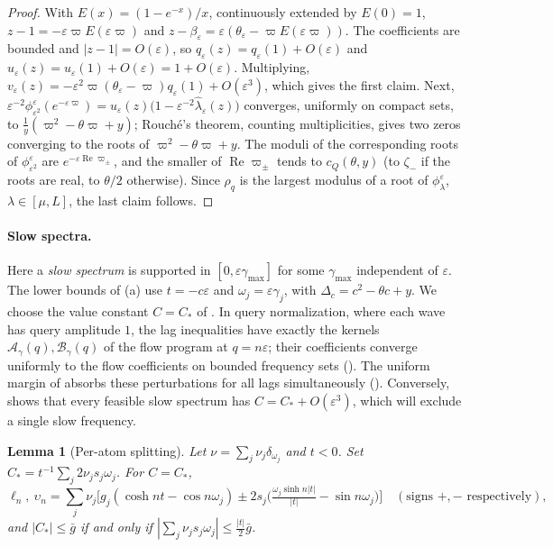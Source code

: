 \documentclass[11pt]{article}
\newtheorem{lemma}[theorem]{Lemma}
\theoremstyle{definition}
\theoremstyle{remark}
\newcommand{\cA}{\mathcal A}
\newcommand{\cB}{\mathcal B}
\newcommand{\ch}{\cosh}
\newcommand{\sh}{\sinh}
\newcommand{\Rea}{\operatorname{Re}}
\newcommand{\cQ}{c_{Q}}
\begin{document}
\begin{proof}
With \(E(x)=(1-e^{-x})/x\), continuously extended by \(E(0)=1\), \(z-1=-\varepsilon\varpi E(\varepsilon\varpi)\) and \(z-\beta_\varepsilon=\varepsilon(\theta_\varepsilon-\varpi E(\varepsilon\varpi))\).  The
coefficients are bounded and \(|z-1|=O(\varepsilon)\), so \(q_\varepsilon(z)=q_\varepsilon(1)+O(\varepsilon)\) and
\(u_\varepsilon(z)=u_\varepsilon(1)+O(\varepsilon)=1+O(\varepsilon)\).  Multiplying, \(v_\varepsilon(z)=-\varepsilon^2\varpi(\theta_\varepsilon-\varpi)q_\varepsilon(1)+O(\varepsilon^3)\), which gives
the first claim.  Next, \(\varepsilon^{-2}\phi^\varepsilon_{\varepsilon^2}(e^{-\varepsilon\varpi})=u_\varepsilon(z)\bigl(1-\varepsilon^{-2}\hat\lambda_\varepsilon(z)\bigr)\) converges, uniformly
on compact sets, to \(\frac1y(\varpi^2-\theta\varpi+y)\); Rouch\'e's theorem, counting multiplicities, gives two zeros converging
to the roots of \(\varpi^2-\theta\varpi+y\).  The moduli of the corresponding roots of \(\phi^\varepsilon_{\varepsilon^2}\) are \(e^{-\varepsilon\Rea\varpi_\pm}\),
and the smaller of \(\Rea\varpi_\pm\) tends to \(\cQ(\theta,y)\) (to \(\zeta_-\) if the roots are real, to \(\theta/2\)
otherwise).  Since \(\rho_q\) is the largest modulus of a root of \(\phi^\varepsilon_\lambda\), \(\lambda\in[\mu,L]\), the last claim
follows.
\end{proof}

\paragraph{Slow spectra.}
Here a \emph{slow spectrum} is supported in \([0,\varepsilon\gamma_{\max}]\)
for some \(\gamma_{\max}\) independent of \(\varepsilon\).
The lower bounds of (a) use \(t=-c\varepsilon\) and
\(\omega_j=\varepsilon\gamma_j\), with \(\Delta_c=c^2-\theta c+y\).
We choose the value constant \(C=C_*\) of .
In query normalization, where each wave has query amplitude \(1\), the lag inequalities have exactly the
kernels \(\cA_\gamma(q),\cB_\gamma(q)\) of the flow program at
\(q=n\varepsilon\); their coefficients converge uniformly to the flow
coefficients on bounded frequency sets ().
The uniform margin of  absorbs these perturbations
for all lags simultaneously ().
Conversely,  shows that every feasible slow spectrum
has \(C=C_*+O(\varepsilon^3)\), which will exclude a single slow frequency.

\begin{lemma}[Per-atom splitting]\label{lem:split}
Let \(\nu=\sum_j\nu_j\delta_{\omega_j}\) and \(t<0\).  Set
\(C_*=t^{-1}\sum_j2\nu_js_j\omega_j\).  For \(C=C_*\),
\[
\ell_n,\ \upsilon_n=\textstyle\sum_j\nu_j\bigl[g_j(\ch nt-\cos n\omega_j)\pm2s_j\bigl(\tfrac{\omega_j\sh n|t|}{|t|}-\sin n\omega_j\bigr)\bigr]
\quad(\text{signs }+,-\text{ respectively}),
\]
and \(|C_*|\le\bar g\) if and only if \(|\sum_j\nu_js_j\omega_j|\le\frac{|t|}2\bar g\).
\end{lemma}
\end{document}
